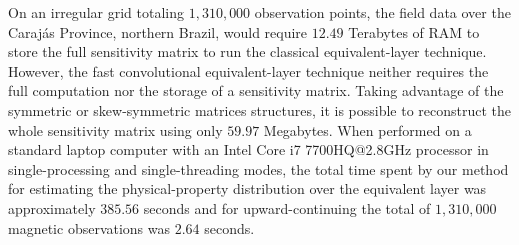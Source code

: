 On an irregular grid totaling $1,310,000$ observation points, the field data over the Carajás Province, northern Brazil, would require $12.49$ Terabytes of RAM to store the full sensitivity matrix  to run the classical equivalent-layer technique. 
However, the fast convolutional equivalent-layer technique  neither requires the full computation nor the storage of a sensitivity matrix.
Taking advantage of the symmetric or skew-symmetric matrices structures, it is possible to reconstruct the whole sensitivity matrix using only $59.97$ Megabytes.
When performed on a standard laptop computer with an Intel Core i7 7700HQ@2.8GHz processor in single-processing and single-threading modes, the total time spent by our method for estimating the physical-property distribution over the equivalent layer was approximately $385.56$ seconds and for upward-continuing the total of $1,310,000$ magnetic observations  was $2.64$ seconds.

